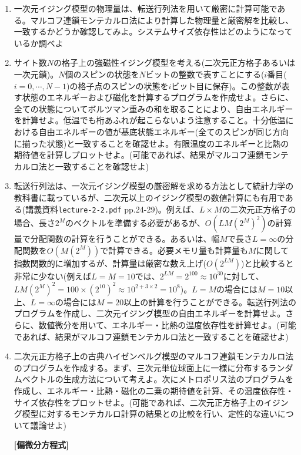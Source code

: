\documentclass[11pt]{jarticle}
\begin{document}
\begin{enumerate}
\item 一次元イジング模型の物理量は、転送行列法を用いて厳密に計算可能である。マルコフ連鎖モンテカルロ法により計算した物理量と厳密解を比較し、一致するかどうか確認してみよ。システムサイズ依存性はどのようになっているか調べよ

\item サイト数$N$の格子上の強磁性イジング模型を考える(二次元正方格子あるいは一次元鎖)。$N$個のスピンの状態を$N$ビットの整数で表すことにする($i$番目($i=0,\cdots,N-1$)の格子点のスピンの状態を$i$ビット目に保存)。この整数が表す状態のエネルギーおよび磁化を計算するプログラムを作成せよ。さらに、全ての状態についてボルツマン重みの和を取ることにより、自由エネルギーを計算せよ。低温でも桁あふれが起こらないよう注意すること。十分低温における自由エネルギーの値が基底状態エネルギー(全てのスピンが同じ方向に揃った状態)と一致することを確認せよ。有限温度のエネルギーと比熱の期待値を計算しプロットせよ。(可能であれば、結果がマルコフ連鎖モンテカルロ法と一致することを確認せよ)

\item 転送行列法は、一次元イジング模型の厳密解を求める方法として統計力学の教科書に載っているが、二次元以上のイジング模型の数値計算にも有用である(講義資料{\tt lecture-2-2.pdf} pp.24-29)。例えば、$L\times M$の二次元正方格子の場合、長さ$2^M$のベクトルを準備する必要があるが、$O(LM(2^M)^2)$の計算量で分配関数の計算を行うことができる。あるいは、幅$M$で長さ$L=\infty$の分配関数を$O(M(2^M))$で計算できる。必要メモリ量も計算量も$M$に関して指数関数的に増加するが、計算量は厳密な数え上げ($O(2^{LM})$)と比較すると非常に少ない(例えば$L=M=10$では、$2^{LM}=2^{100}\approx 10^{30}$に対して、$LM(2^M)^2=100 \times (2^{10})^2 \approx 10^{2+3\times2} = 10^{8}$)。$L=M$の場合には$M=10$以上、$L=\infty$の場合には$M=20$以上の計算を行うことができる。転送行列法のプログラムを作成し、二次元イジング模型の自由エネルギーを計算せよ。さらに、数値微分を用いて、エネルギー・比熱の温度依存性を計算せよ。(可能であれば、結果がマルコフ連鎖モンテカルロ法と一致することを確認せよ)

\item 二次元正方格子上の古典ハイゼンベルグ模型のマルコフ連鎖モンテカルロ法のプログラムを作成する。まず、三次元単位球面上に一様に分布するランダムベクトルの生成方法について考えよ。次にメトロポリス法のプログラムを作成し、エネルギー・比熱・磁化の二乗の期待値を計算、その温度依存性・サイズ依存性をプロットせよ。(可能であれば、二次元正方格子上のイジング模型に対するモンテカルロ計算の結果との比較を行い、定性的な違いについて議論せよ)

\hspace*{-2em} {\bf [偏微分方程式]}


\end{enumerate}
\end{document}
